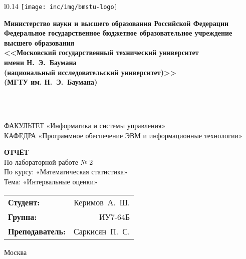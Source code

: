 \begin{titlepage}
	{\large %
	\onehalfspacing
	\centering

	\begin{wrapfigure}[7]{l}{0.14\linewidth}
		\vspace{3mm}
		\hspace{-10mm}
		\texttt{[image: inc/img/bmstu-logo]}
	\end{wrapfigure}
	{\singlespacing \footnotesize \bfseries Министерство науки и высшего образования Российской Федерации\\Федеральное государственное бюджетное образовательное учреждение\\высшего образования\\<<Московский государственный технический университет\\имени Н.~Э.~Баумана\\ (национальный исследовательский университет)>>\\(МГТУ им. Н.~Э.~Баумана)\\}

	\vspace{-2.2mm}
	\vhrulefill{0.9mm}\\
	\vspace{-7.5mm}
	\vhrulefill{0.2mm}\\
	\vspace{2mm}

	{\doublespacing \small \raggedright ФАКУЛЬТЕТ \hspace{37mm} «Информатика и системы управления»\\
	КАФЕДРА \hspace{17mm} «Программное обеспечение ЭВМ и информационные технологии»\\}

	\vspace{30mm}

	\textbf{ОТЧЁТ}\\
	По лабораторной работе № 2\\
	По курсу: «Математическая статистика»\\
	Тема: «Интервальные оценки»\\

	\vspace{40mm}

	\begin{flushleft}
		\begin{tabular}{lr}
			\textbf{Студент:}        & Керимов~А.~Ш.  \\
			\textbf{Группа:}         & ИУ7-64Б        \\
			\textbf{Преподаватель:}  & Саркисян~П.~С. \\
		\end{tabular}
	\end{flushleft}

	\vfill

	Москва\\
	\the\year\\}
\end{titlepage}

\setcounter{page}{2}
